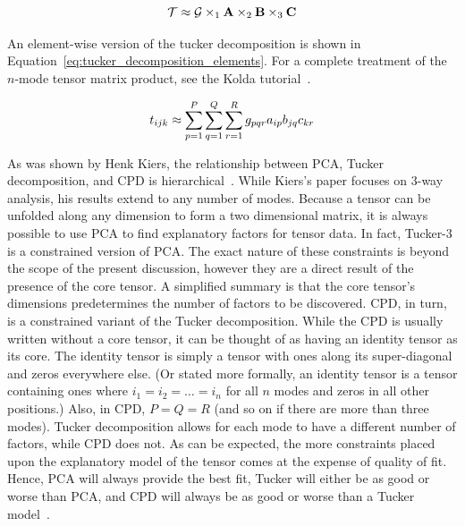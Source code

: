 \documentclass[../ut-dissertation.tex]{subfiles}
\begin{document}
\begin{equation}\label{eq:tucker_decomposition}
  \mathcal{T} \approx \mathcal{G} \times_1 \mathrm{\bf A} \times_2 \mathrm{\bf B} \times_3
  \mathrm{\bf C}
\end{equation}

An element-wise version of the tucker decomposition is shown in
Equation~\ref{eq:tucker_decomposition_elements}.  For a complete
treatment of the $n$-mode tensor matrix product, see the Kolda
tutorial~\cite{kolda2009}.

\begin{equation}\label{eq:tucker_decomposition_elements}
  t_{ijk} \approx \displaystyle\sum_{p=1}^P \displaystyle\sum_{q=1}^Q \displaystyle\sum_{r=1}^R
  g_{pqr}a_{ip}b_{jq}c_{kr}
\end{equation}

As was shown by Henk Kiers, the relationship between PCA, Tucker
decomposition, and CPD is hierarchical~\cite{kiers1991}.  While
Kiers's paper focuses on 3-way analysis, his results extend to any
number of modes.  Because a tensor can be unfolded along any dimension
to form a two dimensional matrix, it is always possible to use PCA to
find explanatory factors for tensor data.  In fact, Tucker-3 is a
constrained version of PCA.  The exact nature of these constraints is
beyond the scope of the present discussion, however they are a direct
result of the presence of the core tensor.  A simplified summary is
that the core tensor's dimensions predetermines the number of
factors to be discovered.  CPD, in turn, is a constrained variant of
the Tucker decomposition.  While the CPD is usually written without a
core tensor, it can be thought of as having an identity tensor as its
core.  The identity tensor is simply a tensor with ones along its
super-diagonal and zeros everywhere else.  (Or stated more formally,
an identity tensor is a tensor containing ones where $i_1 = i_2 =
\ldots =i_n$ for all $n$ modes and zeros in all other positions.)
Also, in CPD, $P=Q=R$ (and so on if there are more than three modes).
Tucker decomposition allows for each mode to have a different number
of factors, while CPD does not.  As can be expected, the more
constraints placed upon the explanatory model of the tensor comes at
the expense of quality of fit.  Hence, PCA will always provide the
best fit, Tucker will either be as good or worse than PCA, and CPD
will always be as good or worse than a Tucker model~\cite{kiers1991,
  bro1997}.
\end{document}
